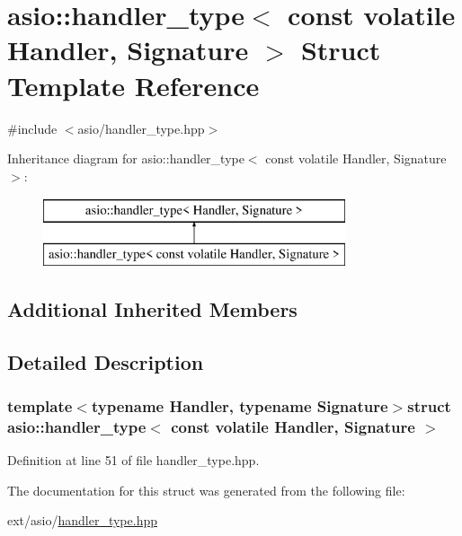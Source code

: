 \hypertarget{structasio_1_1handler__type_3_01const_01volatile_01_handler_00_01_signature_01_4}{}\section{asio\+:\+:handler\+\_\+type$<$ const volatile Handler, Signature $>$ Struct Template Reference}
\label{structasio_1_1handler__type_3_01const_01volatile_01_handler_00_01_signature_01_4}


{\ttfamily \#include $<$asio/handler\+\_\+type.\+hpp$>$}

Inheritance diagram for asio\+:\+:handler\+\_\+type$<$ const volatile Handler, Signature $>$\+:\begin{figure}[H]
\begin{center}
\leavevmode
\includegraphics[height=2.000000cm]{structasio_1_1handler__type_3_01const_01volatile_01_handler_00_01_signature_01_4}
\end{center}
\end{figure}
\subsection*{Additional Inherited Members}


\subsection{Detailed Description}
\subsubsection*{template$<$typename Handler, typename Signature$>$struct asio\+::handler\+\_\+type$<$ const volatile Handler, Signature $>$}



Definition at line 51 of file handler\+\_\+type.\+hpp.



The documentation for this struct was generated from the following file\+:\begin{DoxyCompactItemize}
\item 
ext/asio/\hyperlink{handler__type_8hpp}{handler\+\_\+type.\+hpp}\end{DoxyCompactItemize}
